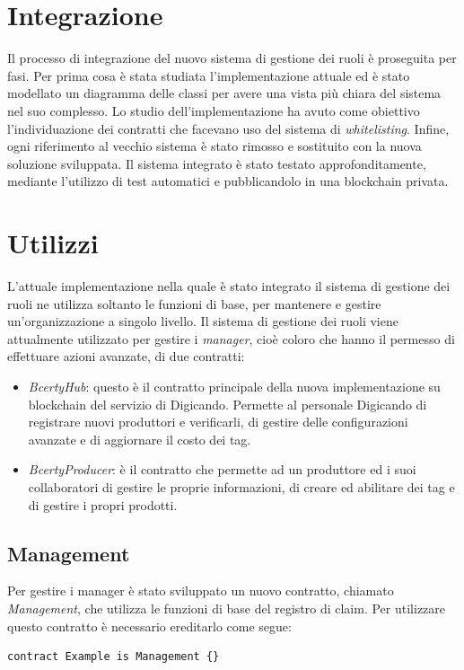 \section{Integrazione}
Il processo di integrazione del nuovo sistema di gestione dei ruoli è proseguita per fasi. Per prima cosa è stata studiata l'implementazione attuale ed è stato modellato un diagramma delle classi per avere una vista più chiara del sistema nel suo complesso. Lo studio dell'implementazione ha avuto come obiettivo l'individuazione dei contratti che facevano uso del sistema di \emph{whitelisting}. Infine, ogni riferimento al vecchio sistema è stato rimosso e sostituito con la nuova soluzione sviluppata. Il sistema integrato è stato testato approfonditamente, mediante l'utilizzo di test automatici e pubblicandolo in una blockchain privata.

\section{Utilizzi}
L'attuale implementazione nella quale è stato integrato il sistema di gestione dei ruoli ne utilizza soltanto le funzioni di base, per mantenere e gestire un'organizzazione a singolo livello. Il sistema di gestione dei ruoli viene attualmente utilizzato per gestire i \emph{manager}, cioè coloro che hanno il permesso di effettuare azioni avanzate, di due contratti:
\begin{itemize}
    \item \emph{BcertyHub}: questo è il contratto principale della nuova implementazione su blockchain del servizio di Digicando. Permette al personale Digicando di registrare nuovi produttori e verificarli, di gestire delle configurazioni avanzate e di aggiornare il costo dei tag. 
    \item \emph{BcertyProducer}: è il contratto che permette ad un produttore ed i suoi collaboratori di gestire le proprie informazioni, di creare ed abilitare dei tag e di gestire i propri prodotti.
\end{itemize}

\subsection{Management}
Per gestire i manager è stato sviluppato un nuovo contratto, chiamato \emph{Management}, che utilizza le funzioni di base del registro di claim. Per utilizzare questo contratto è necessario ereditarlo come segue:
\noindent
\begin{lstlisting}[language=Solidity]
    contract Example is Management {}
\end{lstlisting}


